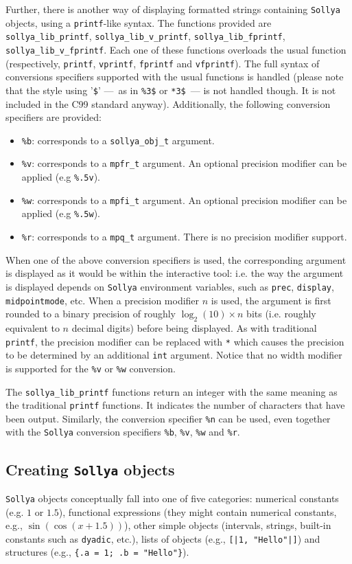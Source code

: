 \documentclass[a4paper]{article}
\newcommand{\sollya}{\texttt{Sollya}\xspace}
\begin{document}
Further, there is another way of displaying formatted strings containing \sollya objects, using a {\tt printf}-like syntax. The functions provided are \verb|sollya_lib_printf|, \verb|sollya_lib_v_printf|, \verb|sollya_lib_fprintf|, \verb|sollya_lib_v_fprintf|. Each one of these functions overloads the usual function (respectively, \verb|printf|, \verb|vprintf|, \verb|fprintf| and \verb|vfprintf|). The full syntax of conversions specifiers supported with the usual functions is handled (please note that the style using '\verb|$|' ---~as in \verb|%3$| or \verb|*3$|~--- is not handled though. It is not included in the C99 standard anyway). Additionally, the following conversion specifiers are provided:
\begin{itemize}
\item \verb|%b|: corresponds to a \verb|sollya_obj_t| argument.
\item \verb|%v|: corresponds to a \verb|mpfr_t| argument. An optional precision modifier can be applied (e.g \verb|%.5v|).
\item \verb|%w|: corresponds to a \verb|mpfi_t| argument. An optional precision modifier can be applied (e.g \verb|%.5w|).
\item \verb|%r|: corresponds to a \verb|mpq_t| argument. There is no precision modifier support.
\end{itemize}
When one of the above conversion specifiers is used, the corresponding argument is displayed as it would be within the interactive tool: i.e. the way the argument is displayed depends on \sollya environment variables, such as \verb|prec|, \verb|display|, \verb|midpointmode|, etc. When a precision modifier $n$ is used, the argument is first rounded to a binary precision of roughly $\log_2(10)\times n$ bits (i.e. roughly equivalent to $n$ decimal digits) before being displayed. As with traditional \verb|printf|, the precision modifier can be replaced with \verb|*| which causes the precision to be determined by an additional \verb|int| argument. Notice that no width modifier is supported for the \verb|%v| or \verb|%w| conversion.

The \verb|sollya_lib_printf| functions return an integer with the same meaning as the traditional \verb|printf| functions. It indicates the number of characters that have been output. Similarly, the conversion specifier \verb|%n| can be used, even together with the \sollya conversion specifiers \verb|%b|, \verb|%v|, \verb|%w| and \verb|%r|.

\subsection{Creating \sollya objects}
\sollya objects conceptually fall into one of five categories: numerical constants (e.g. $1$ or $1.5$), functional expressions (they might contain numerical constants, e.g., $\sin(\cos(x+1.5))$), other simple objects (intervals, strings, built-in constants such as \texttt{dyadic}, etc.), lists of objects (e.g., \texttt{[|1, "Hello"|]}) and structures (e.g., \verb|{.a = 1; .b = "Hello"}|).
\end{document}
